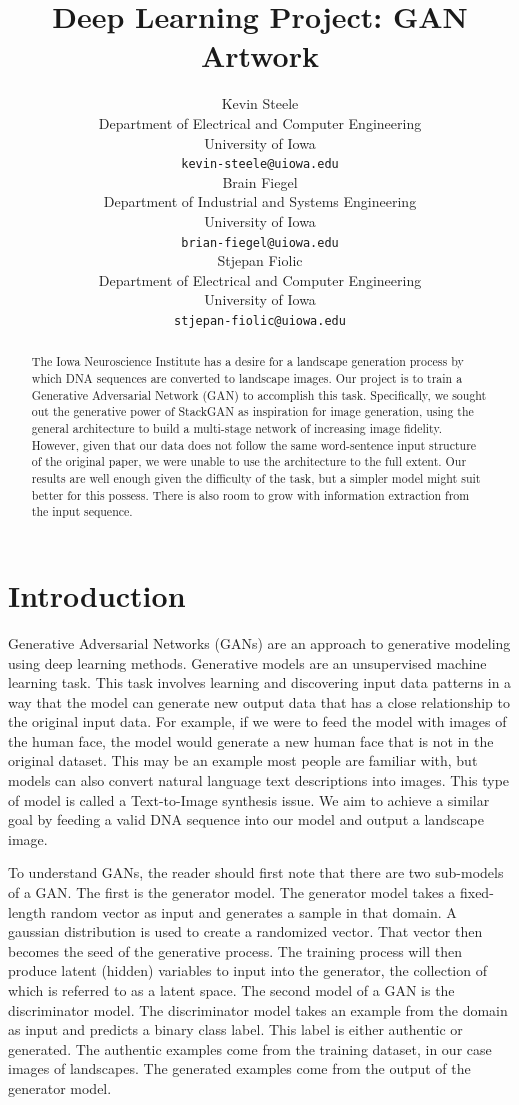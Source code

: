 \documentclass{article}
\title{Deep Learning Project: GAN Artwork}
\author{
	Kevin Steele \\
	Department of Electrical and Computer Engineering \\
	University of Iowa\\
	\texttt{kevin-steele@uiowa.edu} \\
	\And
	Brain Fiegel \\
	Department of Industrial and Systems Engineering \\
	University of Iowa\\
	\texttt{brian-fiegel@uiowa.edu} \\
	\And
	Stjepan Fiolic \\
	Department of Electrical and Computer Engineering \\
	University of Iowa\\
	\texttt{stjepan-fiolic@uiowa.edu} \\
}
\begin{document}
	\maketitle
	
	\begin{abstract}
		The Iowa Neuroscience Institute has a desire for a landscape generation process by which DNA sequences are converted to landscape images. Our project is to train a Generative Adversarial Network (GAN) to accomplish this task. Specifically, we sought out the generative power of StackGAN as inspiration for image generation, using the general architecture to build a multi-stage network of increasing image fidelity. However, given that our data does not follow the same word-sentence input structure of the original paper, we were unable to use the architecture to the full extent. Our results are well enough given the difficulty of the task, but a simpler model might suit better for this possess. There is also room to grow with information extraction from the input sequence.

	\end{abstract}
	
	
	
	
	\section{Introduction}
	\label{sec:intro}
	
	Generative Adversarial Networks (GANs) are an approach to generative modeling using deep learning methods. Generative models are an unsupervised machine learning task.  This task involves learning and discovering input data patterns in a way that the model can generate new output data that has a close relationship to the original input data. For example, if we were to feed the model with images of the human face, the model would generate a new human face that is not in the original dataset. This may be an example most people are familiar with, but models can also convert natural language text descriptions into images.  This type of model is called a Text-to-Image synthesis issue. We aim to achieve a similar goal by feeding a valid DNA sequence into our model and output a landscape image. 
	
	To understand GANs, the reader should first note that there are two sub-models of a GAN. The first is the generator model. The generator model takes a fixed-length random vector as input and generates a sample in that domain. A gaussian distribution is used to create a randomized vector. That vector then becomes the seed of the generative process. The training process will then produce latent (hidden) variables to input into the generator, the collection of which is referred to as a latent space. The second model of a GAN is the discriminator model. The discriminator model takes an example from the domain as input and predicts a binary class label.  This label is either authentic or generated. The authentic examples come from the training dataset, in our case images of landscapes. The generated examples come from the output of the generator model.  
	
\end{document}
